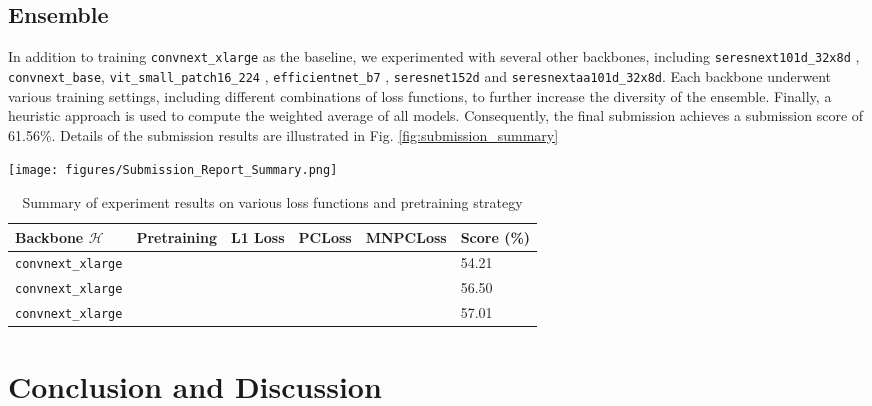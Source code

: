 \documentclass{article}
\newcommand{\xmark}{\ding{55}}%
\newcommand{\cmark}{\ding{51}}%
\begin{document}
\subsection{Ensemble}
In addition to training \texttt{convnext\_xlarge} as the baseline, we experimented with several other backbones, including \texttt{seresnext101d\_32x8d} \cite{hu2018squeeze}, \texttt{convnext\_base}\cite{liu2022convnet}, \texttt{vit\_small\_patch16\_224} \cite{dosovitskiy2020image}, \texttt{efficientnet\_b7} \cite{tan2019efficientnet}, \texttt{seresnet152d}\cite{hu2018squeeze} and \texttt{seresnextaa101d\_32x8d}\cite{hu2018squeeze}. Each backbone underwent various training settings, including different combinations of loss functions, to further increase the diversity of the ensemble. Finally, a heuristic approach is used to compute the weighted average of all models. Consequently, the final submission achieves a submission score of 61.56\%. Details of the submission results are illustrated in Fig. \ref{fig:submission_summary}


\begin{figure*}[ht]
    \centering
    \texttt{[image: figures/Submission\_Report\_Summary.png]}
    \caption{Submission report summary.}
    \label{fig:submission_summary}
\end{figure*}

\begin{table}[!ht]
\centering
\begin{tabular}{|l|l|l|l|l|l|}
\hline
Backbone $\mathcal{H}$      & Pretraining & L1 Loss  & PCLoss & MNPCLoss & Score (\%) \\ \hline
\texttt{convnext\_xlarge}  & \xmark      & \cmark & \xmark     & \xmark & 54.21            \\ \hline
\texttt{convnext\_xlarge}  & \cmark         & \cmark & \xmark     & \xmark       & 56.50            \\ \hline
\texttt{convnext\_xlarge}  & \cmark         & \cmark & \cmark    & \cmark      & 57.01            \\ \hline
\end{tabular}
\label{tab:result}
\caption{Summary of experiment results on various loss functions and pretraining strategy}
\end{table}

\section{Conclusion and Discussion}
\end{document}
